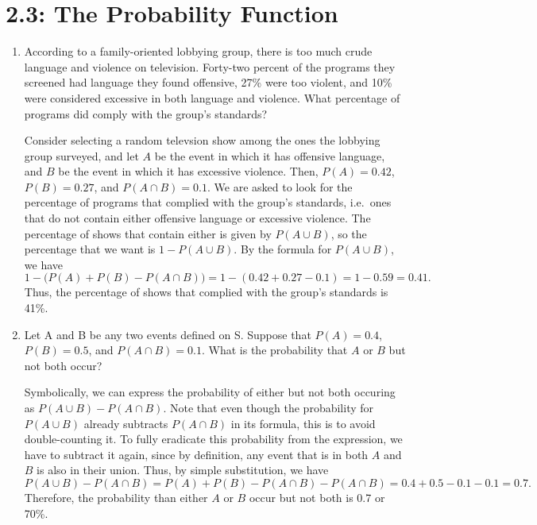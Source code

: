 \documentclass{article}
\begin{document}
\section*{2.3: The Probability Function} 
\begin{enumerate}
    \item According to a family-oriented lobbying group, there is too much crude language and violence on television. Forty-two percent of the programs they screened
    had language they found offensive, 27\% were too violent, and 10\% were considered excessive in both language and violence. What percentage of programs did comply with
    the group's standards?\begin{solution}
        Consider selecting a random televsion show among the ones the lobbying group surveyed, and let \(A\) be the event in which it has offensive language, and \(B\) be the 
        event in which it has excessive violence. Then, \(P(A) = 0.42\), \(P(B) = 0.27\), and \(P(A\cap{}B) = 0.1\). We are asked to look for the percentage of programs that 
        complied with the group's standards, i.e.\ ones that do not contain either offensive language or excessive violence. The percentage of shows that contain either is given 
        by \(P(A\cup{}B)\), so the percentage that we want is \(1- P(A\cup{}B)\). By the formula for \(P(A\cup{}B)\), we have\[
            1 - \big(P(A) + P(B) - P(A\cap{}B)\big) = 1 - (0.42 + 0.27 - 0.1) = 1 - 0.59 = 0.41. 
        \] Thus, the percentage of shows that complied with the group's standards is 41\%. 
    \end{solution}
    \item Let A and B be any two events defined on S. Suppose that \(P(A) = 0.4\), \(P(B) = 0.5\), and \(P(A\cap{}B) = 0.1\). What is the probability that \(A\) or \(B\) but not both occur?\begin{solution}
        Symbolically, we can express the probability of either but not both occuring as \(P(A\cup{}B) - P(A\cap{}B)\). Note that even though the probability for \(P(A\cup{}B)\) already subtracts 
        \(P(A\cap{}B)\) in its formula, this is to avoid double-counting it. To fully eradicate this probability from the expression, we have to subtract it again, since by definition,
        any event that is in both \(A\) and \(B\) is also in their union. Thus, by simple substitution, we have\[
            P(A\cup{}B) - P(A\cap{}B) = P(A) + P(B) - P(A\cap{}B) - P(A\cap{}B) = 0.4 + 0.5 - 0.1 - 0.1 = 0.7. 
        \] Therefore, the probability than either \(A\) or \(B\) occur but not both is 0.7 or 70\%. 

\end{solution}
\end{enumerate}
\end{document}
